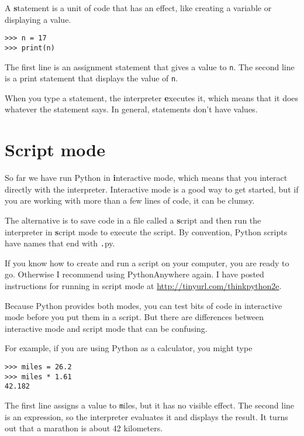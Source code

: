 \documentclass[
DIV=11,
fontsize=12,
twoside,
headinclude=false,
titlepage=firstiscover,
abstract=true,
headsepline=true,
footsepline=true,
chapterprefix=true, %
headings=big,
bibliography=totoc,%
captions=tableheading
]{scrbook}
\theoremstyle{definition}
\begin{document}
A {\textbf statement} is a unit of code that has an effect, like
creating a variable or displaying a value.  

\begin{lstlisting}
>>> n = 17
>>> print(n)
\end{lstlisting}
%
The first line is an assignment statement that gives a value to
{\texttt n}.  The second line is a print statement that displays the
value of {\texttt n}.

When you type a statement, the interpreter {\textbf executes} it,
which means that it does whatever the statement says.  In general,
statements don't have values.


\section{Script mode}

So far we have run Python in {\textbf interactive mode}, which
means that you interact directly with the interpreter.
Interactive mode is a good way to get started,
but if you are working with more than a few lines of code, it can be
clumsy.

The alternative is to save code in a file called a {\textbf script} and
then run the interpreter in {\textbf script mode} to execute the script.  By
convention, Python scripts have names that end with {\texttt .py}.

If you know how to create and run a script on your computer, you
are ready to go.  Otherwise I recommend using PythonAnywhere again.
I have posted instructions for running in script mode at
\url{http://tinyurl.com/thinkpython2e}.

Because Python provides both modes,
you can test bits of code in interactive mode before you put them
in a script.  But there are differences between interactive mode
and script mode that can be confusing.

For example, if you are using Python as a calculator, you might type

\begin{lstlisting}
>>> miles = 26.2
>>> miles * 1.61
42.182
\end{lstlisting}

The first line assigns a value to {\texttt miles}, but it has no visible
effect.  The second line is an expression, so the
interpreter evaluates it and displays the result.  It turns out that a
marathon is about 42 kilometers.
\end{document}
